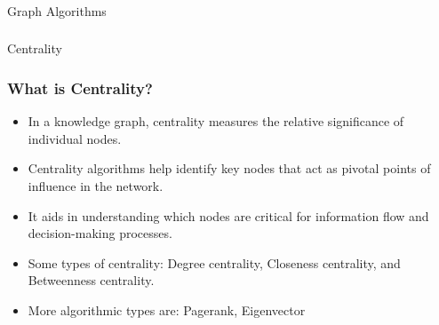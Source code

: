 \begin{frame}[fragile]\frametitle{}
\begin{center}
{\Large Graph Algorithms}
\end{center}
\end{frame}

\begin{frame}[fragile]\frametitle{}
\begin{center}
{\Large Centrality }
\end{center}
\end{frame}


\begin{frame}[fragile]\frametitle{What is Centrality?}
\begin{itemize}
\item In a knowledge graph, centrality measures the relative significance of individual nodes.
\item Centrality algorithms help identify key nodes that act as pivotal points of influence in the network.
\item It aids in understanding which nodes are critical for information flow and decision-making processes.
\item Some types of centrality: Degree centrality, Closeness centrality, and Betweenness centrality.
\item More algorithmic types are: Pagerank, Eigenvector
\end{itemize}
\end{frame}

